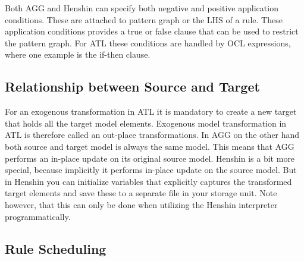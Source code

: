 Both AGG and Henshin can specify both negative and positive application
conditions. These are attached to pattern graph or the LHS of a rule. These
application conditions provides a true or false clause that can be used to
restrict the pattern graph. For ATL these conditions are handled by OCL
expressions, where one example is the if-then clause.

\subsection{Relationship between Source and Target}
For an exogenous transformation in ATL it is mandatory to create a new target
that holds all the target model elements. Exogenous model transformation in ATL
is therefore called an out-place transformations. In AGG on the other hand both
source and target model is always the same model. This means that AGG performs an
in-place update on its original source model. Henshin is a bit more special,
because implicitly it performs in-place update on the source model. But in
Henshin you can initialize variables that explicitly captures the transformed
target elements and save these to a separate file in your storage unit. Note
however, that this can only be done when utilizing the Henshin interpreter
programmatically. 

\subsection{Rule Scheduling}

